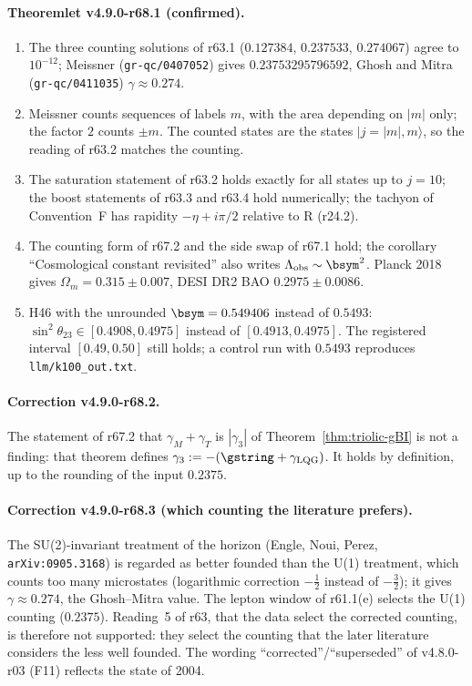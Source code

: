 \paragraph{Theoremlet v4.9.0-r68.1 (confirmed).}
\begin{enumerate}[leftmargin=2em]
\item[(a)] The three counting solutions of r63.1 (\(0.127384\), \(0.237533\), \(0.274067\)) agree to \(10^{-12}\); Meissner (\texttt{gr-qc/0407052}) gives
\(0.23753295796592\), Ghosh and Mitra (\texttt{gr-qc/0411035}) \(\gamma\approx0.274\).
\item[(b)] Meissner counts sequences of labels \(m\), with the area depending on \(|m|\) only; the factor \(2\) counts \(\pm m\).  The counted states are the
states \(|j=|m|,m\rangle\), so the reading of r63.2 matches the counting.
\item[(c)] The saturation statement of r63.2 holds exactly for all states up to \(j=10\); the boost statements of r63.3 and r63.4 hold numerically; the
tachyon of Convention~F has rapidity \(-\eta+i\pi/2\) relative to R (r24.2).
\item[(d)] The counting form of r67.2 and the side swap of r67.1 hold; the corollary ``Cosmological constant revisited'' also writes
\(\Lambda_{\mathrm{obs}}\sim\bsym^2\).  Planck 2018 gives \(\Omega_m=0.315\pm0.007\), DESI DR2 BAO \(0.2975\pm0.0086\).
\item[(e)] H46 with the unrounded \(\bsym=0.549406\) instead of \(0.5493\): \(\sin^2\theta_{23}\in[0.4908,0.4975]\) instead of \([0.4913,0.4975]\).  The registered
interval \([0.49,0.50]\) still holds; a control run with \(0.5493\) reproduces \texttt{llm/k100\_out.txt}.
\end{enumerate}

\paragraph{Correction v4.9.0-r68.2.}
The statement of r67.2 that \(\gamma_M+\gamma_T\) is \(|\gamma_3|\) of Theorem~\ref{thm:triolic-gBI} is not a finding: that theorem defines
\(\gamma_3:=-(\gstring+\gamma_{\mathrm{LQG}})\).  It holds by definition, up to the rounding of the input \(0.2375\).

\paragraph{Correction v4.9.0-r68.3 (which counting the literature prefers).}
The SU(2)-invariant treatment of the horizon (Engle, Noui, Perez, \texttt{arXiv:0905.3168}) is regarded as better founded than the U(1) treatment, which counts
too many microstates (logarithmic correction \(-\tfrac12\) instead of \(-\tfrac32\)); it gives \(\gamma\approx0.274\), the Ghosh--Mitra value.  The lepton window of
r61.1(e) selects the U(1) counting (\(0.2375\)).  Reading~5 of r63, that the data select the corrected counting, is therefore not supported: they select the counting
that the later literature considers the less well founded.  The wording ``corrected''/``superseded'' of v4.8.0-r03 (F11) reflects the state of 2004.

